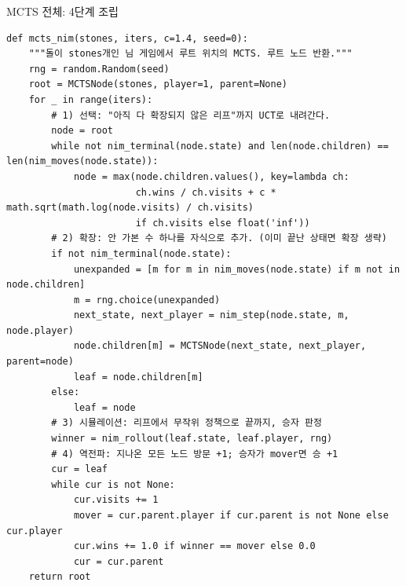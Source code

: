 \documentclass[aspectratio=169,11pt]{beamer}
\begin{document}
\begin{frame}[fragile]{MCTS 전체: 4단계 조립}
\begin{lstlisting}
def mcts_nim(stones, iters, c=1.4, seed=0):
    """돌이 stones개인 님 게임에서 루트 위치의 MCTS. 루트 노드 반환."""
    rng = random.Random(seed)
    root = MCTSNode(stones, player=1, parent=None)
    for _ in range(iters):
        # 1) 선택: "아직 다 확장되지 않은 리프"까지 UCT로 내려간다.
        node = root
        while not nim_terminal(node.state) and len(node.children) == len(nim_moves(node.state)):
            node = max(node.children.values(), key=lambda ch:
                       ch.wins / ch.visits + c * math.sqrt(math.log(node.visits) / ch.visits)
                       if ch.visits else float('inf'))
        # 2) 확장: 안 가본 수 하나를 자식으로 추가. (이미 끝난 상태면 확장 생략)
        if not nim_terminal(node.state):
            unexpanded = [m for m in nim_moves(node.state) if m not in node.children]
            m = rng.choice(unexpanded)
            next_state, next_player = nim_step(node.state, m, node.player)
            node.children[m] = MCTSNode(next_state, next_player, parent=node)
            leaf = node.children[m]
        else:
            leaf = node
        # 3) 시뮬레이션: 리프에서 무작위 정책으로 끝까지, 승자 판정
        winner = nim_rollout(leaf.state, leaf.player, rng)
        # 4) 역전파: 지나온 모든 노드 방문 +1; 승자가 mover면 승 +1
        cur = leaf
        while cur is not None:
            cur.visits += 1
            mover = cur.parent.player if cur.parent is not None else cur.player
            cur.wins += 1.0 if winner == mover else 0.0
            cur = cur.parent
    return root
\end{lstlisting}
\end{frame}

\end{document}
